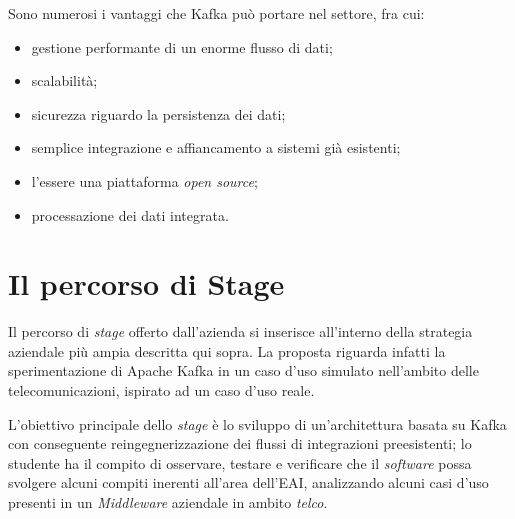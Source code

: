 \bigskip\noindent
Sono numerosi i vantaggi che Kafka può portare nel settore, fra cui:
\begin{itemize}
  \item gestione performante di un enorme flusso di dati;
  \item scalabilità;
  \item sicurezza riguardo la persistenza dei dati;
  \item semplice integrazione e affiancamento a sistemi già esistenti;
  \item l'essere una piattaforma \textit{open source};
  \item processazione dei dati integrata.
\end{itemize}


%

\section{Il percorso di Stage}

%
%

Il percorso di \textit{stage} offerto dall'azienda si inserisce all'interno della strategia aziendale più ampia descritta qui sopra.
La proposta riguarda infatti la sperimentazione di Apache Kafka in un caso d'uso simulato nell'ambito delle telecomunicazioni, ispirato ad un caso d'uso reale.

L'obiettivo principale dello \textit{stage} è lo sviluppo di un'architettura basata su Kafka con conseguente reingegnerizzazione dei flussi di integrazioni preesistenti; lo studente ha il compito di osservare, testare e verificare che il \textit{software} possa svolgere alcuni compiti inerenti all'area dell'EAI, analizzando alcuni casi d'uso presenti in un \textit{Middleware} aziendale in ambito \textit{telco}.

